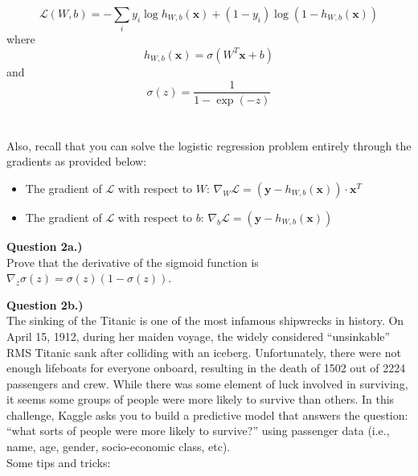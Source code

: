 \documentclass[paper=a4, fontsize=11pt]{scrartcl} %
\begin{document}
\begin{equation}
    \mathcal{L}(W, b) = -\sum_i y_i \log{ h_{W,b}(\textbf{x}) } + (1 - y_i) \log{( 1 - h_{W,b}(\textbf{x})) } \nonumber
\end{equation}
where 
\begin{equation}
h_{W,b}(\textbf{x}) = \sigma \left( W^T\textbf{x} + b \right) \nonumber
\end{equation}
and
\begin{equation}
\sigma(z) = \frac{1}{1 - \exp(-z)} \nonumber
\end{equation} \\
\\
Also, recall that you can solve the logistic regression problem entirely through the gradients as provided below:

\begin{itemize}
    \item The gradient of $\mathcal{L}$ with respect to $W$: $\nabla_W \mathcal{L} = \left(\textbf{y} - h_{W,b}(\textbf{x}) \right) \cdot \textbf{x}^T$
    \item The gradient of $\mathcal{L}$ with respect to $b$: $\nabla_b \mathcal{L} = \left(\textbf{y} - h_{W,b}(\textbf{x}) \right)$
\end{itemize}


{\Large \textbf{Question 2a.)}} \\

Prove that the derivative of the sigmoid function is $\nabla_z \sigma(z) = \sigma(z) \left(1 - \sigma(z)\right)$. 

\vspace{1cm}
{\Large \textbf{Question 2b.)}} \\

The sinking of the Titanic is one of the most infamous shipwrecks in history. On April 15, 1912, during her maiden voyage, the widely considered “unsinkable” RMS Titanic sank after colliding with an iceberg. Unfortunately, there were not enough lifeboats for everyone onboard, resulting in the death of 1502 out of 2224 passengers and crew. While there was some element of luck involved in surviving, it seems some groups of people were more likely to survive than others. In this challenge, Kaggle asks you to build a predictive model that answers the question: “what sorts of people were more likely to survive?” using passenger data (i.e., name, age, gender, socio-economic class, etc). \\

Some tips and tricks:
\end{document}
